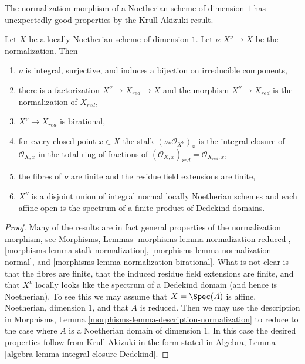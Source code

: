 \noindent
The normalization morphism of a Noetherian scheme of dimension
$1$ has unexpectedly good properties by the Krull-Akizuki result.

\begin{lemma}
\label{lemma-normalize-noetherian-dim-1}
Let $X$ be a locally Noetherian scheme of dimension $1$.
Let $\nu : X^\nu \to X$ be the normalization. Then
\begin{enumerate}
\item $\nu$ is integral, surjective, and induces a bijection
on irreducible components,
\item there is a factorization $X^\nu \to X_{red} \to X$
and the morphism $X^\nu \to X_{red}$ is the normalization
of $X_{red}$,
\item $X^\nu \to X_{red}$ is birational,
\item for every closed point $x \in X$ the stalk
$(\nu_*\mathcal{O}_{X^\nu})_x$ is the integral closure
of $\mathcal{O}_{X, x}$ in the total ring of fractions
of $(\mathcal{O}_{X, x})_{red} = \mathcal{O}_{X_{red}, x}$,
\item the fibres of $\nu$ are finite and the residue
field extensions are finite,
\item $X^\nu$ is a disjoint union of integral normal locally Noetherian
schemes and each affine open is the spectrum of a finite
product of Dedekind domains.
\end{enumerate}
\end{lemma}

\begin{proof}
Many of the results are in fact general properties of the normalization
morphism, see
Morphisms, Lemmas \ref{morphisms-lemma-normalization-reduced},
\ref{morphisms-lemma-stalk-normalization},
\ref{morphisms-lemma-normalization-normal}, and
\ref{morphisms-lemma-normalization-birational}.
What is not clear is that the fibres are finite,
that the induced residue field extensions are finite, and
that $X^\nu$ locally looks like the spectrum of a
Dedekind domain (and hence is Noetherian).
To see this we may assume that $X = \Spec(A)$ is
affine, Noetherian, dimension $1$, and that $A$ is reduced.
Then we may use the description in
Morphisms, Lemma \ref{morphisms-lemma-description-normalization}
to reduce to the case where $A$ is a Noetherian domain
of dimension $1$. In this case the desired properties
follow from Krull-Akizuki in the form stated in
Algebra, Lemma \ref{algebra-lemma-integral-closure-Dedekind}.
\end{proof}

